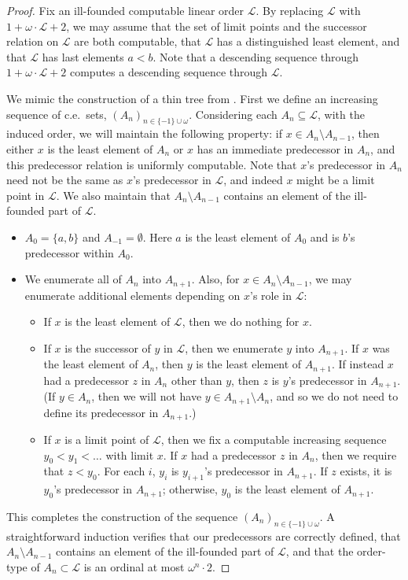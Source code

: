 \documentclass[10pt,a4paper]{amsart}
\newcommand\+[1]{\mathcal{#1}}
\renewcommand\*[1]{\mathbf{#1}}
\renewcommand\=[1]{\text{#1}}
\renewcommand\*[1]{\mathbf{#1}}
\begin{document}
\begin{proof}
Fix an ill-founded computable linear order $\+L$.  By replacing $\+L$ with $1+\omega\cdot \+L+2$, we may assume that the set of limit points and the successor relation on $\+L$ are both computable, that $\+L$ has a distinguished least element, and that $\+L$ has last elements $a < b$.  Note that a descending sequence through $1+\omega\cdot \+L+2$ computes a descending sequence through $\+L$.

We mimic the construction of a thin tree from \cite{km2010}.  First we define an increasing sequence of c.e.\ sets, $(A_n)_{n \in \{-1\} \cup \omega}$.  Considering each $A_n \subseteq \+L$, with the induced order, we will maintain the following property: if $x \in A_n \setminus A_{n-1}$, then either $x$ is the least element of $A_n$ or $x$ has an immediate predecessor in $A_n$, and this predecessor relation is uniformly computable.  Note that $x$'s predecessor in $A_n$ need not be the same as $x$'s predecessor in $\+L$, and indeed $x$ might be a limit point in $\+L$.  We also maintain that $A_n \setminus A_{n-1}$ contains an element of the ill-founded part of $\+L$.
\begin{itemize}
\item $A_0 = \{a, b\}$ and $A_{-1} = \emptyset$.  Here $a$ is the least element of $A_0$ and is $b$'s predecessor within $A_0$.
\item We enumerate all of $A_n$ into $A_{n+1}$.  Also, for $x \in A_n \setminus A_{n-1}$, we may enumerate additional elements depending on $x$'s role in $\+L$:
\begin{itemize}
\item If $x$ is the least element of $\+L$, then we do nothing for $x$.
\item If $x$ is the successor of $y$ in $\+L$, then we enumerate $y$ into $A_{n+1}$.  If $x$ was the least element of $A_n$, then $y$ is the least element of $A_{n+1}$.  If instead $x$ had a predecessor $z$ in $A_n$ other than $y$, then $z$ is $y$'s predecessor in $A_{n+1}$.  (If $y \in A_n$, then we will not have $y \in A_{n+1}\setminus A_n$, and so we do not need to define its predecessor in $A_{n+1}$.)
\item If $x$ is a limit point of $\+L$, then we fix a computable increasing sequence $y_0 < y_1 < \dots$ with limit $x$.  If $x$ had a predecessor $z$ in $A_n$, then we require that $z < y_0$.  For each $i$, $y_i$ is $y_{i+1}$'s predecessor in $A_{n+1}$.  If $z$ exists, it is $y_0$'s predecessor in $A_{n+1}$; otherwise, $y_0$ is the least element of $A_{n+1}$.
\end{itemize}
\end{itemize}
This completes the construction of the sequence $(A_n)_{n \in \{-1\}\cup\omega}$.  A straightforward induction verifies that our predecessors are correctly defined, that $A_n\setminus A_{n-1}$ contains an element of the ill-founded part of $\+L$, and that the order-type of $A_n \subset \+L$ is an ordinal at most $\omega^n\cdot 2$.


\end{proof}
\end{document}
